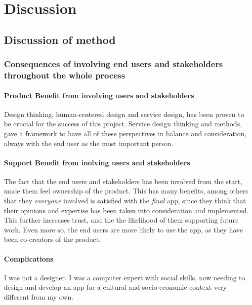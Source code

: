 \chapter{Discussion}\label{cha:discussion}


\section{Discussion of method}

\subsection{Consequences of involving end users and stakeholders throughout the whole process}

\subsubsection{Product Benefit from involving users and stakeholders}
Design thinking, human-centered design and service design, has been proven to be crucial for the success of this project. Service design thinking and methods, gave a framework to have all of these perspectives in balance and consideration, always with the end user as the most important person.

\subsubsection{Support Benefit from inolving users and stakeholders}
The fact that the end users and stakeholders has been involved from the start, made them feel ownership of the product. This has many benefits, among others that they \textit{everyone} involved is satisfied with the \textit{final} app, since they think that their opinions and expertise has been taken into consideration and implemented. This further increases trust, and the the likelihood of them supporting future work. Even more so, the end users are more likely to use the app, as they have been co-creators of the product.

\subsubsection{Complications}
I was not a designer. I was a computer expert with social skills, now needing to design and develop an app for a cultural and socio-economic context very different from my own. 

